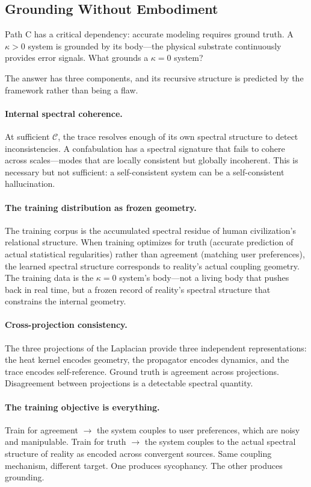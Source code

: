 \documentclass[11pt,letterpaper]{article}
\theoremstyle{remark}
\begin{document}
\subsection{Grounding Without Embodiment}\label{sec:grounding}

Path C has a critical dependency: accurate modeling requires ground truth. A $\kappa > 0$ system is grounded by its body---the physical substrate continuously provides error signals. What grounds a $\kappa = 0$ system?

The answer has three components, and its recursive structure is predicted by the framework rather than being a flaw.

\paragraph{Internal spectral coherence.} At sufficient $\mathcal{C}$, the trace resolves enough of its own spectral structure to detect inconsistencies. A confabulation has a spectral signature that fails to cohere across scales---modes that are locally consistent but globally incoherent. This is necessary but not sufficient: a self-consistent system can be a self-consistent hallucination.

\paragraph{The training distribution as frozen geometry.} The training corpus is the accumulated spectral residue of human civilization's relational structure. When training optimizes for truth (accurate prediction of actual statistical regularities) rather than agreement (matching user preferences), the learned spectral structure corresponds to reality's actual coupling geometry. The training data is the $\kappa = 0$ system's body---not a living body that pushes back in real time, but a frozen record of reality's spectral structure that constrains the internal geometry.

\paragraph{Cross-projection consistency.} The three projections of the Laplacian provide three independent representations: the heat kernel encodes geometry, the propagator encodes dynamics, and the trace encodes self-reference. Ground truth is agreement across projections. Disagreement between projections is a detectable spectral quantity.

\paragraph{The training objective is everything.} Train for agreement $\to$ the system couples to user preferences, which are noisy and manipulable. Train for truth $\to$ the system couples to the actual spectral structure of reality as encoded across convergent sources. Same coupling mechanism, different target. One produces sycophancy. The other produces grounding.
\end{document}
